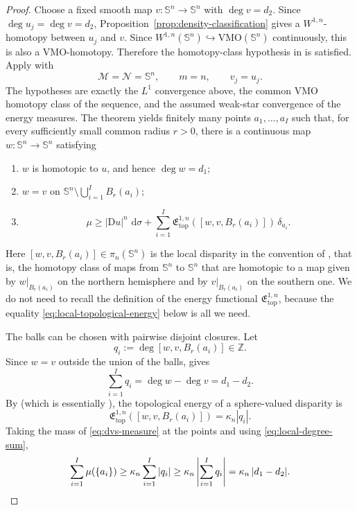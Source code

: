 \documentclass[11pt,reqno]{amsart}
\numberwithin{equation}{section}
\newcommand{\Sph}{\mathbb S}
\newcommand{\Z}{\mathbb Z}
\newcommand{\D}{\mathrm D}
\newcommand{\dd}{\,\mathrm d}
\newcommand{\VMO}{\mathrm{VMO}}
\begin{document}
\begin{proof}
Choose a fixed smooth map $v:\Sph^n\to\Sph^n$ with $\deg v=d_2$. Since $\deg u_j=\deg v=d_2$, Proposition~\ref{prop:density-classification}
gives a $W^{1,n}$-homotopy between $u_j$ and $v$. Since
$W^{1,n}(\Sph^n)\hookrightarrow \VMO(\Sph^n)$ continuously, this is also
a $\VMO$-homotopy. Therefore the homotopy-class hypothesis in
\cite[Theorem~5.1]{DetailleVanSchaftingen} is satisfied. Apply \cite[Theorem~5.1]{DetailleVanSchaftingen} with
\[
  \mathcal M=\mathcal N=\Sph^n,\qquad m=n,
  \qquad v_j=u_j.
\]
The hypotheses are exactly the $L^1$ convergence above, the common $\VMO$ homotopy class of the sequence, and the assumed weak-star convergence of the energy measures.  The theorem yields finitely many points $a_1,\dots,a_I$ such that, for every sufficiently small common radius $r>0$, there is a continuous map $w:\Sph^n\to\Sph^n$ satisfying
\begin{enumerate}[label=\textup{(\roman*)}]
\item $w$ is homotopic to $u$, and hence $\deg w=d_1$;
\item $w=v$ on $\Sph^n\setminus\bigcup_{i=1}^I B_r(a_i)$;
\item
\begin{equation}\label{eq:dvs-measure}
  \mu\ge|\D u|^n\,\dd\sigma
  +\sum_{i=1}^I
  \mathfrak E_{\mathrm{top}}^{1,n}([w,v,B_r(a_i)])\,\delta_{a_i}.
\end{equation}
\end{enumerate}
Here $[w,v,B_r(a_i)]\in\pi_n(\Sph^n)$ is the local disparity in the convention of \cite[Section~4.1]{DetailleVanSchaftingen}, that is, the homotopy class of maps from $\Sph^n$ to $\Sph^n$ that are homotopic
to a map given by $w|_{B_r(a_i)}$ on the northern hemisphere and by $v|_{B_r(a_i)}$ on the southern one. We do not need to recall the definition of the energy functional $\mathfrak E_{\mathrm{top}}^{1,n}$, because the equality \eqref{eq:local-topological-energy} below is all we need.

The balls can be chosen with pairwise disjoint closures. Let
\[
  q_i:=\deg [w,v,B_r(a_i)]\in\Z.
\]
Since $w=v$ outside the union of the balls,  gives
\begin{equation}\label{eq:local-degree-sum}
  \sum_{i=1}^I q_i=\deg w-\deg v=d_1-d_2.
\end{equation}
By \cite[Proposition~4.10]{DetailleVanSchaftingen} (which is essentially ), the topological energy of a sphere-valued disparity is
\begin{equation}\label{eq:local-topological-energy}
  \mathfrak E_{\mathrm{top}}^{1,n}([w,v,B_r(a_i)])
  =\kappa_n|q_i|.
\end{equation}
Taking the mass of \eqref{eq:dvs-measure} at the points and using \eqref{eq:local-degree-sum},
\[
  \sum_{i=1}^I\mu(\{a_i\})
  \ge\kappa_n\sum_{i=1}^I|q_i|
  \ge\kappa_n\left|\sum_{i=1}^I q_i\right|
  =\kappa_n \, |d_1-d_2|.
  \qedhere
\]
\end{proof}
\end{document}
